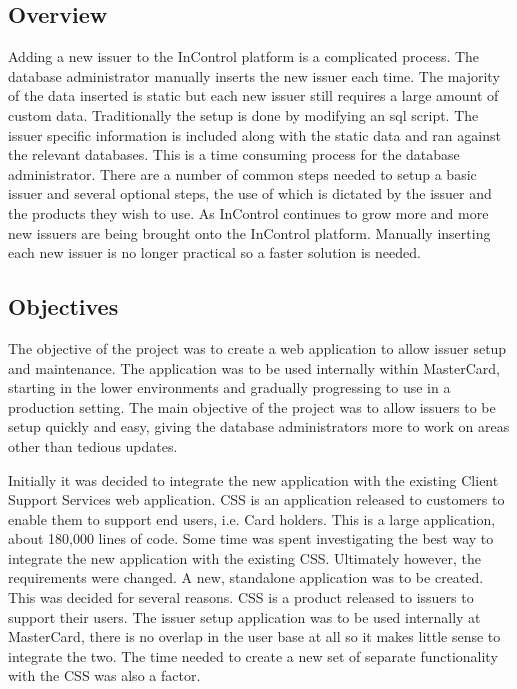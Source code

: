 \documentclass[a4paper, 11pt, titlepage]{article}
\begin{document}
\subsection{Overview} 
Adding a new issuer to the InControl platform is a complicated process. The database administrator manually inserts the new issuer each time. The majority of the data inserted is static but each new issuer still requires a large amount of custom data. Traditionally the setup is done by modifying an sql script. The issuer specific information is included along with the static data and ran against the relevant databases. This is a time consuming process for the database administrator. There are a number of common steps needed to setup a basic issuer and several optional steps, the use of which is dictated by the issuer and the products they wish to use. As InControl continues to grow more and more new issuers are being brought onto the InControl platform. Manually inserting each new issuer is no longer practical so a faster solution is needed. 
 
  
 
\subsection{Objectives} 
 
The objective of the project was to create a web application to allow issuer setup and maintenance. The application was to be used internally within MasterCard, starting in the lower environments and gradually progressing to use in a production setting. The main objective of the project was to allow issuers to be setup quickly and easy, giving the database administrators more to work on areas other than tedious updates. 
 
Initially it was decided to integrate the new application with the existing Client Support Services web application. CSS is an application released to customers to enable them to support end users, i.e. Card holders. This is a large application, about 180,000 lines of code. Some time was spent investigating the best way to integrate the new application with the existing CSS. Ultimately however, the requirements were changed. A new, standalone application was to be created. This was decided for several reasons. CSS is a product released to issuers to support their users. The issuer setup application was to be used internally at MasterCard, there is no overlap in the user base at all so it makes little sense to integrate the two. The time needed to create a new set of separate functionality with the CSS was also a factor. 
 
\end{document}
